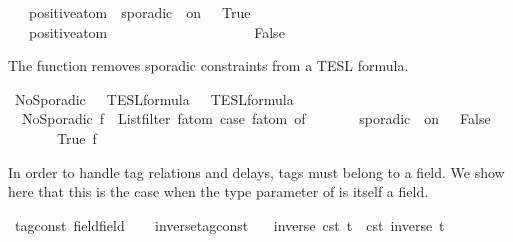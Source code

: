 \begin{isabellebody}
\ \ {\isacharbar}\ {\isacartoucheopen}positive{\isacharunderscore}atom\ {\isacharparenleft}{\isacharunderscore}\ sporadic{\isasymsharp}\ {\isacharunderscore}\ on\ {\isacharunderscore}{\isacharparenright}\ {\isacharequal}\ True{\isacartoucheclose}\isanewline
\ \ {\isacharbar}\ {\isacartoucheopen}positive{\isacharunderscore}atom\ {\isacharunderscore}\ \ \ \ \ \ \ \ \ \ \ \ \ \ \ \ \ \ \ {\isacharequal}\ False{\isacartoucheclose}%
\begin{isamarkuptext}%
The  function removes sporadic constraints from a TESL formula.%
\end{isamarkuptext}\isamarkuptrue%
\isamarkupfalse%
\ NoSporadic\ {\isacharcolon}{\isacharcolon}\ {\isacartoucheopen}{\isacharprime}{\isasymtau}\ TESL{\isacharunderscore}formula\ {\isasymRightarrow}\ {\isacharprime}{\isasymtau}\ TESL{\isacharunderscore}formula{\isacartoucheclose}\isanewline
{}\ \isanewline
\ \ {\isacartoucheopen}NoSporadic\ f\ {\isasymequiv}\ {\isacharparenleft}List{\isachardot}filter\ {\isacharparenleft}{\isasymlambda}f\isactrlsub a\isactrlsub t\isactrlsub o\isactrlsub m{\isachardot}\ case\ f\isactrlsub a\isactrlsub t\isactrlsub o\isactrlsub m\ of\isanewline
\ \ \ \ \ \ {\isacharunderscore}\ sporadic\ {\isacharunderscore}\ on\ {\isacharunderscore}\ {\isasymRightarrow}\ False\isanewline
\ \ \ \ {\isacharbar}\ {\isacharunderscore}\ {\isasymRightarrow}\ True{\isacharparenright}\ f{\isacharparenright}{\isacartoucheclose}%
\isadelimdocument
%
\endisadelimdocument
%
\isatagdocument
%
\isamarkuptrue%
%
\endisatagdocument
{\isafolddocument}%
%
\isadelimdocument
%
\endisadelimdocument
%
\begin{isamarkuptext}%
In order to handle tag relations and delays, tags must belong to a field.
  We show here that this is the case when the type parameter of  
  is itself a field.%
\end{isamarkuptext}\isamarkuptrue%
\isamarkupfalse%
\ tag{\isacharunderscore}const\ {\isacharcolon}{\isacharcolon}{\isacharparenleft}field{\isacharparenright}field\isanewline
{}\isanewline
\ \ \isamarkupfalse%
\ inverse{\isacharunderscore}tag{\isacharunderscore}const\isanewline
\ \ \ {\isacartoucheopen}inverse\ {\isacharparenleft}{\isasymtau}\isactrlsub c\isactrlsub s\isactrlsub t\ t{\isacharparenright}\ {\isacharequal}\ {\isasymtau}\isactrlsub c\isactrlsub s\isactrlsub t\ {\isacharparenleft}inverse\ t{\isacharparenright}{\isacartoucheclose}\isanewline

\end{isabellebody}
